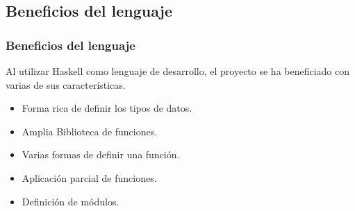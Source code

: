 \documentclass[12pt]{beamer}
\begin{document}
\subsection{Beneficios del lenguaje}
\begin{frame}
\frametitle{Beneficios del lenguaje}

\begin{block}{}
Al utilizar Haskell como lenguaje de desarrollo, el proyecto se ha beneficiado
con varias de sus características.
\end{block}

\begin{itemize}
	\item Forma rica de definir los tipos de datos. 
	\item Amplia Biblioteca de funciones. 
	\item Varias formas de definir una función. 
	\item Aplicación parcial de funciones.
	\item Definición de módulos. 
\end{itemize}
\end{frame}
\end{document}
